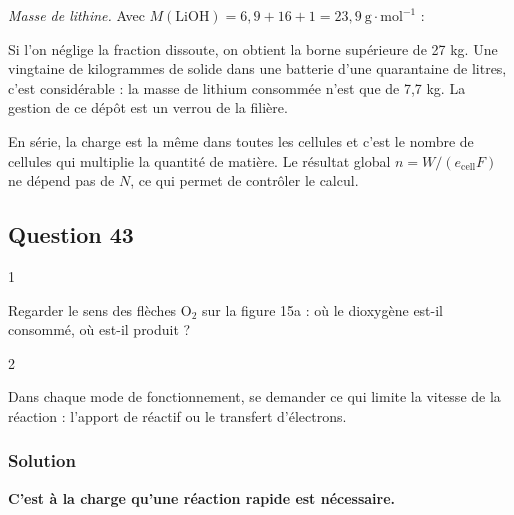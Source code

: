 \documentclass[11pt,a4paper]{article}
\newcommand{\equationajustee}[1]{%
  \sbox{\boiteequation}{$\displaystyle #1$}%
  \ifdim\wd\boiteequation>\linewidth
    \[\resizebox{\linewidth}{!}{\usebox{\boiteequation}}\]%
  \else
    \[#1\]%
  \fi}
\begin{document}
\emph{Masse de lithine.} Avec \(M(\mathrm{LiOH})=6{,}9+16+1=23{,}9\ \text{g}\cdot\text{mol}^{-1}\) :

\equationajustee{m=(1119-215)\times23{,}9\ \text{g}}

\equationajustee{\boxed{m\approx22\ \text{kg}}}

Si l'on néglige la fraction dissoute, on obtient la borne supérieure de 27 kg. Une vingtaine de kilogrammes de solide dans une batterie d'une quarantaine de litres, c'est considérable : la masse de lithium consommée n'est que de 7,7 kg. La gestion de ce dépôt est un verrou de la filière.

\begin{piege}

En série, la charge est la même dans toutes les cellules et c'est le nombre de cellules qui multiplie la quantité de matière. Le résultat global \(n=W/(e_{\text{cell}}F)\) ne dépend pas de \(N\), ce qui permet de contrôler le calcul.

\end{piege}

\hypertarget{question-43}{%
\subsection{Question 43}\label{question-43}}

\begin{indication}{1}

Regarder le sens des flèches \(\mathrm{O_2}\) sur la figure 15a : où le dioxygène est-il consommé, où est-il produit ?

\end{indication}

\begin{indication}{2}

Dans chaque mode de fonctionnement, se demander ce qui limite la vitesse de la réaction : l'apport de réactif ou le transfert d'électrons.

\end{indication}

\hypertarget{solution-42}{%
\subsubsection{Solution}\label{solution-42}}

\textbf{C'est à la charge qu'une réaction rapide est nécessaire.}
\end{document}

